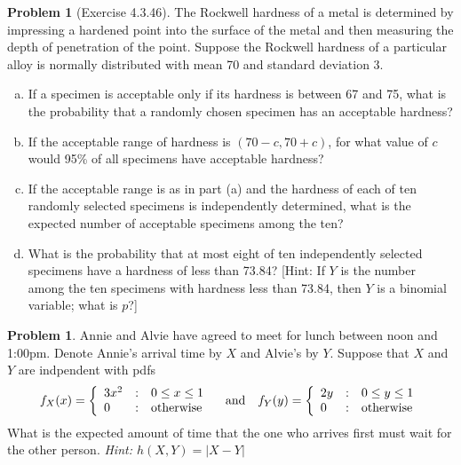 \documentclass[10pt]{article}
\theoremstyle{definition}
\newtheorem{problem}[theorem]{Problem}
\newcommand{\1}[1]{\textbf{1}_{\left[#1\right]}} %
\begin{document}
\begin{problem}[Exercise 4.3.46]
  The Rockwell hardness of a metal is determined by impressing a hardened
  point into the surface of the metal and then measuring the depth of
  penetration of the point. Suppose the Rockwell hardness of a particular
  alloy is normally distributed with mean 70 and standard deviation 3.

  \begin{enumerate}[(a)]
    \item If a specimen is acceptable only if its hardness is between 67 and
    75, what is the probability that a randomly chosen specimen has an
    acceptable hardness?
    \item If the acceptable range of hardness is $(70 - c, 70 + c)$, for what
    value of $c$ would 95\% of all specimens have acceptable hardness?
    \item  If the acceptable range is as in part (a) and the hardness of each of
    ten randomly selected specimens is independently determined, what is the
    expected number of acceptable specimens among the ten?
    \item  What is the probability that at most eight of ten independently selected
    specimens have a hardness of less than 73.84? [Hint: If $Y$ is the number
    among the ten specimens with hardness less than 73.84, then $Y$ is a
    binomial variable; what is $p$?]
  \end{enumerate}
\end{problem}






\begin{problem}
  Annie and Alvie have agreed to meet for lunch between noon and 1:00pm.
  Denote Annie's arrival time by $X$ and Alvie's by $Y$. Suppose that $X$ and
  $Y$ are indpendent with pdfs
  \begin{equation*}
    f_{X}(x) = \left\{ \begin{array}{l@{\quad:\quad}l} 3x^{2} & 0 \leq x \leq 1\\ 0& \text{otherwise}
      \end{array}\right.
    \quad \text{and} \quad 
    f_{Y}(y) = \left\{ \begin{array}{l@{\quad:\quad}l}2y & 0 \leq y \leq 1\\ 0& \text{otherwise}
      \end{array}\right.
  \end{equation*}
  What is the expected amount of time that the one who arrives first must wait
  for the other person. \textit{Hint: $h(X,Y) = |X-Y|$}
\end{problem}
\end{document}
